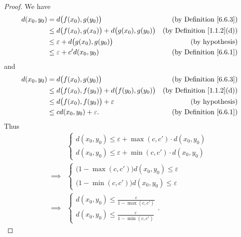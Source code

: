 \begin{proof}
    We have
    \begin{align*}
        d(x_0, y_0) & = d\big(f(x_0), g(y_0)\big)                                & \text{(by Definition \ref{6.6.3})}    \\
                    & \leq d\big(f(x_0), g(x_0)\big) + d\big(g(x_0), g(y_0)\big) & \text{(by Definition \ref{1.1.2}(d))} \\
                    & \leq \varepsilon + d\big(g(x_0), g(y_0)\big)               & \text{(by hypothesis)}                \\
                    & \leq \varepsilon + c' d(x_0, y_0)                          & \text{(by Definition \ref{6.6.1})}
    \end{align*}
    and
    \begin{align*}
        d(x_0, y_0) & = d\big(f(x_0), g(y_0)\big)                                & \text{(by Definition \ref{6.6.3})}    \\
                    & \leq d\big(f(x_0), f(y_0)\big) + d\big(f(y_0), g(y_0)\big) & \text{(by Definition \ref{1.1.2}(d))} \\
                    & \leq d\big(f(x_0), f(y_0)\big) + \varepsilon               & \text{(by hypothesis)}                \\
                    & \leq c d(x_0, y_0) + \varepsilon.                          & \text{(by Definition \ref{6.6.1})}
    \end{align*}
    Thus
    \begin{align*}
                 & \begin{cases}
            d(x_0, y_0) \leq \varepsilon + \max(c, c') \cdot d(x_0, y_0) \\
            d(x_0, y_0) \leq \varepsilon + \min(c, c') \cdot d(x_0, y_0)
        \end{cases}  \\
        \implies & \begin{cases}
            \big(1 - \max(c, c')\big) d(x_0, y_0) \leq \varepsilon \\
            \big(1 - \min(c, c')\big) d(x_0, y_0) \leq \varepsilon
        \end{cases}  \\
        \implies & \begin{cases}
            d(x_0, y_0) \leq \frac{\varepsilon}{1 - \max(c, c')} \\
            d(x_0, y_0) \leq \frac{\varepsilon}{1 - \min(c, c')}
        \end{cases}.
    \end{align*}
\end{proof}